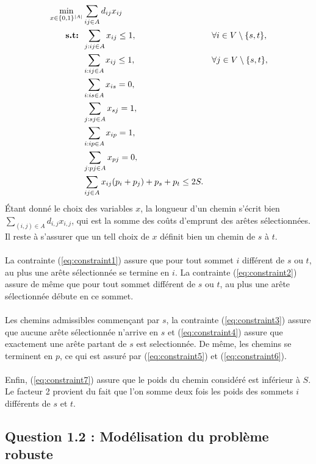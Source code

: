 \documentclass{article}
\begin{document}
\begin{align}
    \min_{x \in \{0,1\}^{|A|}} & \sum_{ij \in A} d_{ij} x_{ij} && \notag \\
    \textbf{s.t: }  &\sum_{j: ij \in A} x_{ij} \leq 1, && \forall i \in V \setminus{\{s,t\}}, \label{eq:constraint1} \\
    &\sum_{i: ij \in A} x_{ij} \leq 1, && \forall j \in V \setminus{\{s,t\}}, \label{eq:constraint2} \\
    &\sum_{i: is \in A} x_{is} = 0, \label{eq:constraint3} \\
    &\sum_{j: sj \in A} x_{sj} = 1, \label{eq:constraint4} \\
    &\sum_{i: ip \in A} x_{ip} = 1, \label{eq:constraint5} \\
    &\sum_{j: pj \in A} x_{pj} = 0, \label{eq:constraint6} \\
    &\sum_{ij \in A} x_{ij}(p_i + p_j) + p_s + p_t \leq 2S. \label{eq:constraint7}
\end{align}
Étant donné le choix des variables $x$, la longueur d'un chemin s'écrit bien $\sum_{(i,j) \in A} d_{i,j} x_{i,j}$, qui est la somme des coûts d'emprunt des arêtes sélectionnées. Il reste à s'assurer que un tell choix de $x$ définit bien un chemin de $s$ à $t$.
\\
\\
La contrainte (\ref{eq:constraint1}) assure que pour tout sommet $i$ différent de $s$ ou $t$, au plus une arête sélectionnée se termine en $i$. La contrainte (\ref{eq:constraint2}) assure de même que pour tout sommet différent de $s$ ou $t$, au plus une arête sélectionnée débute en ce sommet.
\\
\\
Les chemins admissibles commençant par $s$, la contrainte (\ref{eq:constraint3}) assure que aucune arête sélectionnée n'arrive en $s$ et (\ref{eq:constraint4}) assure que exactement une arête partant de $s$ est selectionnée. De même, les chemins se terminent en $p$, ce qui est assuré par (\ref{eq:constraint5}) et (\ref{eq:constraint6}).
\\
\\
Enfin, (\ref{eq:constraint7}) assure que le poids du chemin considéré est inférieur à $S$. Le facteur 2 provient du fait que l'on somme deux fois les poids des sommets $i$ différents de $s$ et $t$.

\subsection{Question 1.2 : Modélisation du problème robuste}
\end{document}

